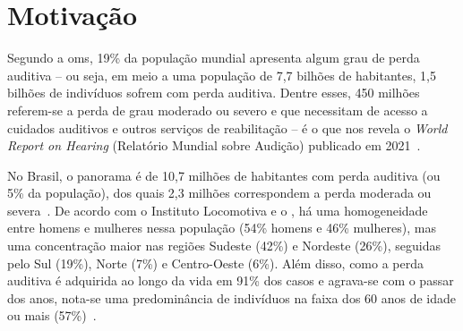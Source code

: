 \section{Motivação}
\label{motivacao}


Segundo a \acrfull{oms}, 19\% da população mundial apresenta algum grau de perda auditiva -- ou seja, em meio a uma população de 7,7 bilhões de habitantes, 1,5 bilhões de indivíduos sofrem com perda auditiva. Dentre esses, 450 milhões referem-se a perda de grau moderado ou severo e que necessitam de acesso a cuidados auditivos e outros serviços de reabilitação -- é o que nos revela o \textit{World Report on Hearing} (Relatório Mundial sobre Audição) publicado em 2021~\cite{who-2021-report-hearing}.




No Brasil, o panorama é de 10,7 milhões de habitantes com perda auditiva (ou 5\% da população), dos quais 2,3 milhões correspondem a perda moderada ou severa~\cite{ebc-2019-10-milhoes-pessoas, ibge-2021-pns, ibge-2021-projecao-populacao}. De acordo com o Instituto Locomotiva e o , há uma homogeneidade entre homens e mulheres nessa população (54\% homens e 46\% mulheres), mas uma concentração maior nas regiões Sudeste (42\%) e Nordeste (26\%), seguidas pelo Sul (19\%), Norte (7\%) e Centro-Oeste (6\%). Além disso, como a perda auditiva é adquirida ao longo da vida em 91\% dos casos e agrava-se com o passar dos anos, nota-se uma predominância de indivíduos na faixa dos 60 anos de idade ou mais (57\%)~\cite{ebc-2019-10-milhoes-pessoas, ibge-2021-pns}.

